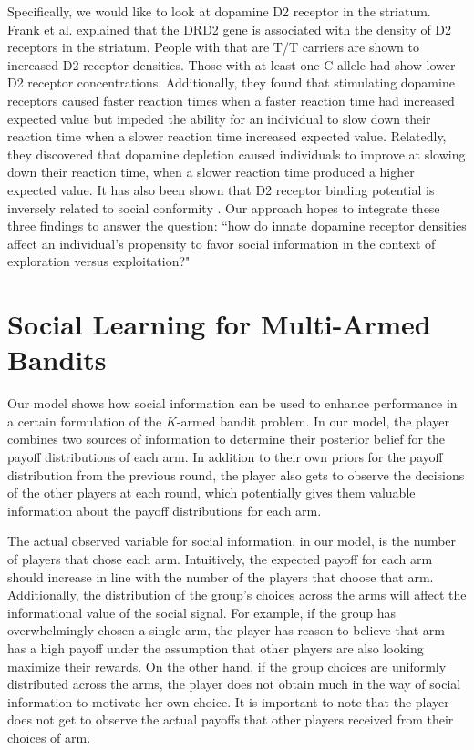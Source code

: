 \documentclass[11pt, a4paper]{article}
\begin{document}
Specifically, we would like to look at dopamine D2 receptor in the striatum. Frank et al.\cite{Frank2009} explained that the DRD2 gene is associated with the density of D2 receptors in the striatum. People with that are T/T carriers are shown to increased D2 receptor densities. Those with at least one C allele had show lower D2 receptor concentrations. Additionally, they found that stimulating dopamine receptors caused faster reaction times when a faster reaction time had increased expected value but impeded the ability for an individual to slow down their reaction time when a slower reaction time increased expected value. Relatedly, they discovered that dopamine depletion caused individuals to improve at slowing down their reaction time, when a slower reaction time produced a higher expected value. It has also been shown that D2 receptor binding potential is inversely related to social conformity \cite{Sigray2014}. Our approach hopes to integrate these three findings to answer the question: ``how do innate dopamine receptor densities affect an individual's propensity to favor social information in the context of exploration versus exploitation?"

\section{Social Learning for Multi-Armed Bandits}

Our model shows how social information can be used to enhance performance in a certain formulation of the $K$-armed bandit problem. In our model, the player combines two sources of information to determine their posterior belief for the payoff distributions of each arm. In addition to their own priors for the payoff distribution from the previous round, the player also gets to observe the decisions of the other players at each round, which potentially gives them valuable information about the payoff distributions for each arm.

The actual observed variable for social information, in our model, is the number of players that chose each arm. Intuitively, the expected payoff for each arm should increase in line with the number of the players that choose that arm. Additionally, the distribution of the group's choices across the arms will affect the informational value of the social signal. For example, if the group has overwhelmingly chosen a single arm, the player has reason to believe that arm has a high payoff under the assumption that other players are also looking maximize their rewards. On the other hand, if the group choices are uniformly distributed across the arms, the player does not obtain much in the way of social information to motivate her own choice. It is important to note that the player does not get to observe the actual payoffs that other players received from their choices of arm.
\end{document}
